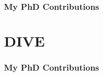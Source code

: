 \begin{frame}[label=current]
\frametitle{My PhD Contributions}

\begin{figure}
\centering


\ovEBM
\ovVWDPM

\ovDKT
\ovTadpole

\ovPainter

\end{figure}

\end{frame}




\section{DIVE}

\begin{frame}
\frametitle{My PhD Contributions}


\begin{figure}
\centering


{ 
\ovEBM 
}
\ovVWDPM

{ 
\ovDKT
\ovTadpole

\ovPainter
}

\end{figure}

\end{frame}


